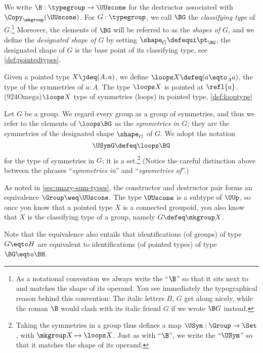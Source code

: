 \begin{definition}\label{def:classifying-type}
  We write $\B : \typegroup \to \UUscone$ for the
  destructor associated with $\Copy_{\mkgroup}(\UUscone)$.
  For $G : \typegroup$,
  we call $\BG$ the \emph{classifying type}
  of $G$.\footnote{%
    As a notational convention we always write the ``$\B$''
    so that it sits next to and matches the shape
    of its operand.
    You see immediately the typographical reason behind this convention:
    The italic letters $B$, $G$ get along nicely,
    while the roman $\B$ would clash with its italic friend $G$
    if we wrote $\B G$ instead.}
  Moreover, the elements of $\BG$ will be referred to as the \emph{shapes of $G$},
  and we define the \emph{designated shape of $G$}
  by setting
  $\shape_G\defequi \pt_{\BG}$,
  \ie the designated shape of $G$ is the base point of its
  classifying type, see \cref{def:pointedtypes}.
\end{definition}

\begin{definition}\label{def:looptype}
  Given a pointed type $X\jdeq(A,a)$, we define
  $\loops X \defeq (a \eqto_A a)$, \ie the type of the symmetries
  of $a:A$. %
  The type $\loops X$ is pointed at $\refl{a}$.%
  \glossary(924Omega){$\protect\loops X$}%
  {type of symmetries (loops) in pointed type, \cref{def:looptype}}
\end{definition}


\begin{definition}\label{def:group-symmetries}
  Let $G$ be a group.
  We regard every group as a group of symmetries,
  and thus we refer to the elements of $\loops \BG$ as the
  \emph{symmetries in $G$};
  they are the symmetries of the designated shape $\shape_G$ of $G$.
  We adopt the notation 
  \[
    \USymG \defeq \loops \BG
  \]
  for the type of symmetries in $G$; it is a set.\footnote{%
    Taking the symmetries in a group
    thus defines a map
    $\USym : \Group \to \Set$,
    with $\mkgroup X \mapsto \loops X$.
    Just as with ``$\B$'', we write the ``$\USym$'' so that it matches
    the shape of its operand.}
  (Notice the careful distinction above between the phrases
  ``\emph{symmetries in}'' and ``\emph{symmetries of}''.) 
\end{definition}

\begin{remark}\label{rem:aut}
  As noted in \cref{sec:unary-sum-types},
  the constructor and destructor pair forms an equivalence $\Group \weq \UUscone$.
  The type $\UUscone$ is a subtype of $\UUp$, so
  once you know that a pointed type $X$ is a connected groupoid,
  you also know that $X$ is the classifying type of a group,
  namely $G\defeq\mkgroup X$.

  Note that the equivalence also entails that identifications (of groups) of type $G \eqto H$ are equivalent to identifications (of pointed
  types) of type $\BG \eqto \BH$.
\end{remark}

